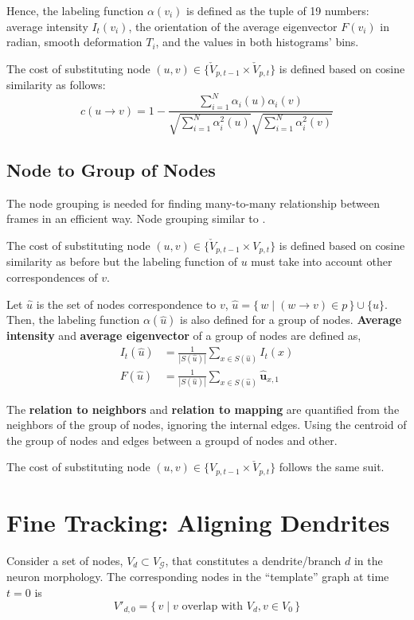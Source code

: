 \documentclass[10pt,letterpaper]{article}
\begin{document}
Hence, the labeling function $\alpha(v_i)$ is defined as the tuple of 19 numbers: average intensity $I_t(v_i)$, the orientation of the average eigenvector $F(v_i)$ in radian, smooth deformation $T_i$, and the values in both histograms' bins.

The cost of substituting node $(u,v) \in \{ \check{V}_{p,t-1} \times \check{V}_{p,t} \}$ is defined based on cosine similarity as follows:
\begin{equation}
c(u \rightarrow v) = 1 - \frac{\sum_{i=1}^N \alpha_i(u)\alpha_i(v)}{\sqrt{\sum_{i=1}^N \alpha_i^2(u)}\sqrt{\sum_{i=1}^N \alpha_i^2(v)}}
\end{equation}

\subsection{Node to Group of Nodes}
The node grouping is needed for finding many-to-many relationship between frames in an efficient way. Node grouping similar to \cite{morrison2015}.

The cost of substituting node $(u,v) \in \{ \check{V}_{p,t-1} \times V_{p,t} \}$ is defined based on cosine similarity as before but the labeling function of $u$ must take into account other correspondences of $v$.

Let $\hat{u}$ is the set of nodes correspondence to $v$, $\hat{u} = \{\, w \mid (w \rightarrow v) \in p \,\} \cup \{u\}$. Then, the labeling function $\alpha(\hat{u})$ is also defined for a group of nodes. \textbf{Average intensity} and \textbf{average eigenvector} of a group of nodes are defined as,
\begin{equation}
\begin{aligned}
I_t(\hat{u}) & = \frac{1}{|S(\hat{u})|}\sum_{x \in S(\hat{u})} I_t(x) \\
F(\hat{u}) & = \frac{1}{|S(\hat{u})|}\sum_{x \in S(\hat{u})} \hat{\textbf{u}}_{x,1}
\end{aligned}
\end{equation} 

The \textbf{relation to neighbors} and \textbf{relation to mapping} are quantified from the neighbors of the group of nodes, ignoring the internal edges. Using the centroid of the group of nodes and edges between a groupd of nodes and other.

The cost of substituting node $(u,v) \in \{ V_{p,t-1} \times \check{V}_{p,t} \}$ follows the same suit.




\section{Fine Tracking: Aligning Dendrites}
Consider a set of nodes, $V_d \subset V_\mathcal{G}$, that constitutes a dendrite/branch $d$ in the neuron morphology. The corresponding nodes in the ``template'' graph at time $t = 0$ is
\begin{equation}
V'_{d,0} = \{\,v \mid v \text{ overlap with } V_d, v \in V_0 \,\}
\end{equation}
\end{document}
